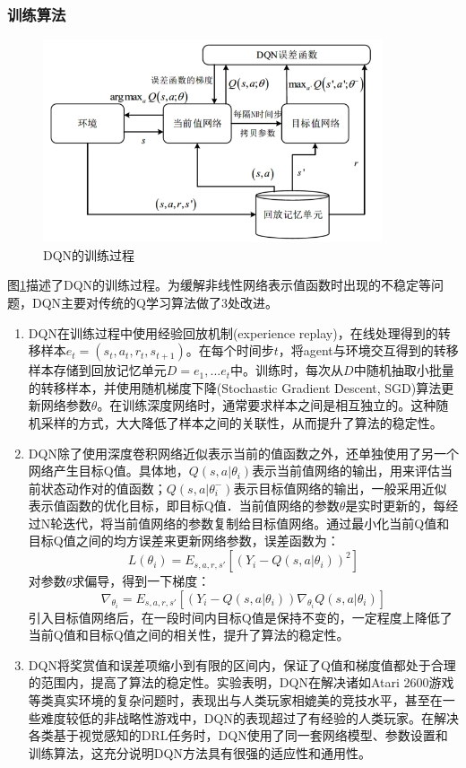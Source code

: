 \documentclass[bachelor]{thesis-uestc}
\begin{document}
	\subsubsection{训练算法}
	\begin{figure}
		\includegraphics[width=10cm]{./pic/fg2.jpg}
		\caption{DQN的训练过程}
		\label{fg2}
	\end{figure}
	图\ref{fg2}描述了DQN的训练过程。为缓解非线性网络表示值函数时出现的不稳定等问题，DQN主要对传统的Q学习算法做了3处改进。
	
	\begin{enumerate}
		\item DQN在训练过程中使用经验回放机制(experience replay)，在线处理得到的转移样本$e_t=(s_t,a_t,r_t,s_{t+1})$。在每个时间步$t$，将agent与环境交互得到的转移样本存储到回放记忆单元$D={e_1,...e_t}$中。训练时，每次从$D$中随机抽取小批量的转移样本，并使用随机梯度下降(Stochastic Gradient Descent, SGD)算法更新网络参数$\theta$。在训练深度网络时，通常要求样本之间是相互独立的。这种随机采样的方式，大大降低了样本之间的关联性，从而提升了算法的稳定性。
		
		\item DQN除了使用深度卷积网络近似表示当前的值函数之外，还单独使用了另一个网络产生目标Q值。具体地，$Q(s,a|\theta_i)$表示当前值网络的输出，用来评估当前状态动作对的值函数；$Q(s,a|\theta^-_i)$表示目标值网络的输出，一般采用近似表示值函数的优化目标，即目标Q值．当前值网络的参数$\theta$是实时更新的，每经过N轮迭代，将当前值网络的参数复制给目标值网络。通过最小化当前Q值和目标Q值之间的均方误差来更新网络参数，误差函数为：
		\begin{equation}
			\label{eq6}
			L(\theta_i)=E_{s,a,r,s'}[(Y_i-Q(s,a|\theta_i))^2]
		\end{equation}
		对参数$\theta$求偏导，得到一下梯度：
		\begin{equation}
			\label{eq7}
			\nabla_{\theta_i}=E_{s,a,r,s'}[(Y_i-Q(s,a|\theta_i))\nabla_{\theta_i}Q(s,a|\theta_i)]
		\end{equation}
		引入目标值网络后，在一段时间内目标Q值是保持不变的，一定程度上降低了当前Q值和目标Q值之间的相关性，提升了算法的稳定性。
		
		\item DQN将奖赏值和误差项缩小到有限的区间内，保证了Q值和梯度值都处于合理的范围内，提高了算法的稳定性。实验表明，DQN在解决诸如Atari 2600游戏等类真实环境的复杂问题时，表现出与人类玩家相媲美的竞技水平，甚至在一些难度较低的非战略性游戏中，DQN的表现超过了有经验的人类玩家。在解决各类基于视觉感知的DRL任务时，DQN使用了同一套网络模型、参数设置和训练算法，这充分说明DQN方法具有很强的适应性和通用性。
	\end{enumerate}
\end{document}
